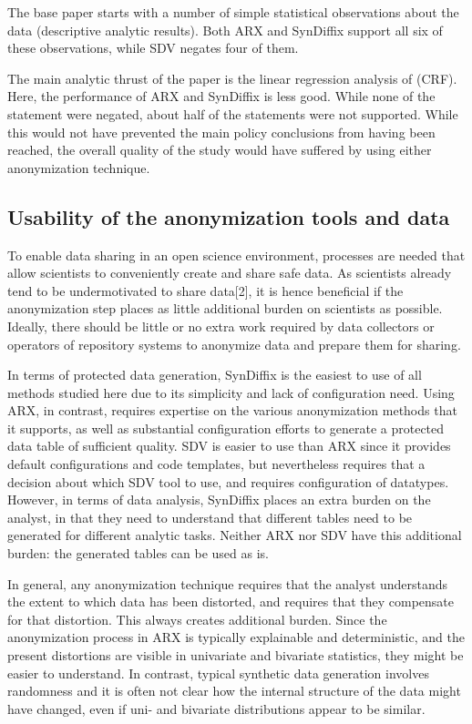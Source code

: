 \documentclass[10pt]{article}
\newcommand{\mycite}[1]{[#1]}
\begin{document}
The base paper starts with a number of simple statistical observations about the data (descriptive analytic results). Both ARX and SynDiffix support all six of these observations, while SDV negates four of them. 

The main analytic thrust of the paper is the linear regression analysis of (CRF). Here, the performance of ARX and SynDiffix is less good. While none of the statement were negated, about half of the statements were not supported. While this would not have prevented the main policy conclusions from having been reached, the overall quality of the study would have suffered by using either anonymization technique.

\subsection*{Usability of the anonymization tools and data}

To enable data sharing in an open science environment, processes are needed that allow scientists to conveniently create and share safe data. As scientists already tend to be undermotivated to share data\mycite{2}, it is hence beneficial if the anonymization step places as little additional burden on scientists as possible. Ideally, there should be little or no extra work required by data collectors or operators of repository systems to anonymize data and prepare them for sharing.

In terms of protected data generation, SynDiffix is the easiest to use of all methods studied here due to its simplicity and lack of configuration need. Using ARX, in contrast, requires expertise on the various anonymization methods that it supports, as well as substantial configuration efforts to generate a protected data table of sufficient quality. SDV is easier to use than ARX since it provides default configurations and code templates, but nevertheless requires that a decision about which SDV tool to use, and requires configuration of datatypes. However, in terms of data analysis, SynDiffix places an extra burden on the analyst, in that they need to understand that different tables need to be generated for different analytic tasks. Neither ARX nor SDV have this additional burden: the generated tables can be used as is. 

In general, any anonymization technique requires that the analyst understands the extent to which data has been distorted, and requires that they compensate for that distortion. This always creates additional burden. Since the anonymization process in ARX is typically explainable and deterministic, and the present distortions are visible in univariate and bivariate statistics, they might be easier to understand. In contrast, typical synthetic data generation involves randomness and it is often not clear how the internal structure of the data might have changed, even if uni- and bivariate distributions appear to be similar. 
\end{document}
